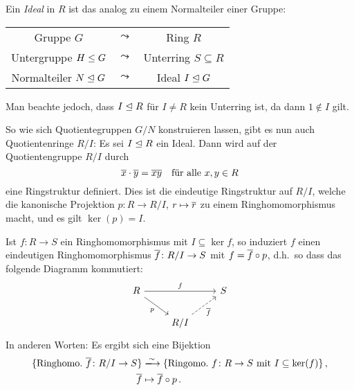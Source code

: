 \noindent
\begin{minipage}[t]{\textwidth}
Ein \emph{Ideal} in $R$ ist das analog zu einem Normalteiler einer Gruppe:
\begin{center}
  \renewcommand{\arraystretch}{1.3}
  \begin{tabular}{ccc}
      Gruppe $G$
    & $\leadsto$
    & Ring $R$
    \\
      Untergruppe $H \mathrel{\leq} G$
    & $\leadsto$
    & Unterring $S \subseteq R$
    \\
      Normalteiler $N \mathrel{\trianglelefteq} G$
    & $\leadsto$
    & Ideal $I \mathrel{\trianglelefteq} G$
  \end{tabular}
\end{center}
Man beachte jedoch, dass $I \mathrel{\trianglelefteq} R$ für $I \neq R$ kein Unterring ist, da dann $1 \notin I$ gilt.
\end{minipage}

So wie sich Quotientegruppen $G/N$ konstruieren lassen, gibt es nun auch Quotientenringe $R/I$:
Es sei $I \mathrel{\trianglelefteq} R$ ein Ideal.
Dann wird auf der Quotientengruppe $R/I$ durch
\[
    \overline{x} \cdot \overline{y}
  = \overline{xy}
  \quad
  \text{für alle $x, y \in R$}
\]
eine Ringstruktur definiert.
Dies ist die eindeutige Ringstruktur auf $R/I$, welche die kanonische Projektion $p \colon R \to R/I$, $r \mapsto \overline{r}$ zu einem Ringhomomorphismus macht, und es gilt $\ker(p) = I$.

\begin{theorem}
  Ist $f \colon R \to S$ ein Ringhomomorphismus mit $I \subseteq \ker f$, so induziert $f$ einen eindeutigen Ringhomomorphismus $\overline{f} \colon R/I \to S$ mit $f = \overline{f} \circ p$, d.h.\ so dass das folgende Diagramm kommutiert:
  \[
    \begin{tikzcd}
        R
        \arrow{rr}[above]{f}
        \arrow{dr}[below left]{p}
      & {}
      & S
      \\
        {}
      & R/I
        \arrow[dashed]{ru}[below right]{\induced{f}}
      & {}
    \end{tikzcd}
  \]
  In anderen Worten:
  Es ergibt sich eine Bijektion
  \begin{align*}
                            \{ \text{Ringhomo.\ $\induced{f} \colon R/I \to S$} \}
    &\xlongrightarrow{\sim} \{ \text{Ringomo.\ $f \colon R \to S$ mit $I \subseteq \ker(f)$} \} \,,  \\
                            \induced{f}
    &\mapsto                \induced{f} \circ p \,.
  \end{align*}
\end{theorem}

